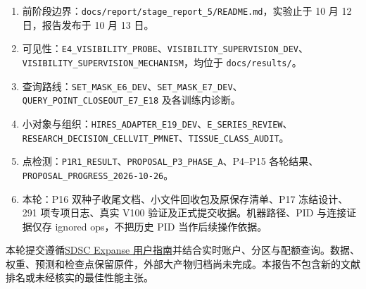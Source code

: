 \documentclass[UTF8,zihao=-4,fontset=windows]{ctexart}
\begin{document}
\begin{enumerate}
\item 前阶段边界：\texttt{docs/report/stage\_\allowbreak{}report\_\allowbreak{}5/README.md}，实验止于 10 月 12 日，报告发布于 10 月 13 日。
\item 可见性：\texttt{E4\_\allowbreak{}VISIBILITY\_\allowbreak{}PROBE}、\texttt{VISIBILITY\_\allowbreak{}SUPERVISION\_\allowbreak{}DEV}、\texttt{VISIBILITY\_\allowbreak{}SUPERVISION\_\allowbreak{}MECHANISM}，均位于 \texttt{docs/results/}。
\item 查询路线：\texttt{SET\_\allowbreak{}MASK\_\allowbreak{}E6\_\allowbreak{}DEV}、\texttt{SET\_\allowbreak{}MASK\_\allowbreak{}E7\_\allowbreak{}DEV}、\texttt{QUERY\_\allowbreak{}POINT\_\allowbreak{}CLOSEOUT\_\allowbreak{}E7\_\allowbreak{}E18} 及各训练内诊断。
\item 小对象与组织：\texttt{HIRES\_\allowbreak{}ADAPTER\_\allowbreak{}E19\_\allowbreak{}DEV}、\texttt{E\_\allowbreak{}SERIES\_\allowbreak{}REVIEW}、\texttt{RESEARCH\_\allowbreak{}DECISION\_\allowbreak{}CELLVIT\_\allowbreak{}PMNET}、\texttt{TISSUE\_\allowbreak{}CLASS\_\allowbreak{}AUDIT}。
\item 点检测：\texttt{P1R1\_\allowbreak{}RESULT}、\texttt{PROPOSAL\_\allowbreak{}P3\_\allowbreak{}PHASE\_\allowbreak{}A}、P4--P15 各轮结果、\texttt{PROPOSAL\_\allowbreak{}PROGRESS\_\allowbreak{}2026-10-26}。
\item 本轮：P16 双种子收尾文档、小文件回收包及原保存清单、P17 冻结设计、291 项专项日志、真实 V100 验证及正式提交收据。机器路径、PID 与连接证据仅存 ignored ops，不把历史 PID 当作后续操作依据。
\end{enumerate}

本轮提交遵循\href{https://www.sdsc.edu/systems/expanse/user_guide.html}{SDSC Expanse 用户指南}并结合实时账户、分区与配额查询。数据、权重、预测和检查点保留原件，外部大产物归档尚未完成。本报告不包含新的文献排名或未经核实的最佳性能主张。
\end{document}
